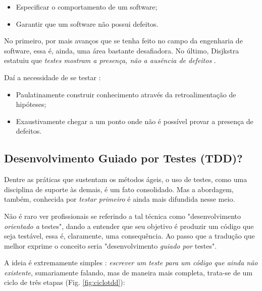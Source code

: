 \documentclass[12pt,a4paper,oneside,english,brazil]{article}
\begin{document}
      \begin{itemize}
        \item Especificar o comportamento de um software;
        \item Garantir que um software não possui defeitos.
      \end{itemize}

    No primeiro, por mais avanços que se tenha feito no campo da engenharia de
    software, essa é, ainda, uma área bastante desafiadora. No último, Disjkstra
    estatuiu que \emph{testes mostram a presença, não a ausência de defeitos}
    \cite[p. 16]{Nato1969}.

    Daí a necessidade de se testar \cite[p. xxix-xxx]{Mezaros2007}:

      \begin{itemize}
        \item Paulatinamente construir conhecimento através da retroalimentação
          de hipóteses;
        \item Exaustivamente chegar a um ponto onde não é possível provar a
          presença de defeitos.
      \end{itemize}


    \subsection{Desenvolvimento Guiado por Testes (TDD)?}

      Dentre as práticas que sustentam os métodos ágeis, o uso de testes, como
      uma disciplina de suporte às demais, é um fato consolidado. Mas a
      abordagem, também, conhecida por \emph{testar primeiro} é ainda mais
      difundida nesse  meio.

      Não é raro ver profissionais se referindo a tal técnica como
      "desenvolvimento \emph{orientado a} testes", dando a entender que seu
      objetivo é produzir um código que seja testável, essa é, claramente, uma
      consequência. Ao passo que a tradução que melhor exprime o conceito seria
      "desenvolvimento \emph{guiado por} testes".

      A ideia é extremamente simples \cite[p.1]{FreemanPryce2009}: \emph{escrever um
      teste para um código que ainda não existente}, sumariamente falando, mas
      de maneira mais completa, trata-se de um ciclo de três etapas (Fig.
      \ref{fig:ciclotdd}):
\end{document}
